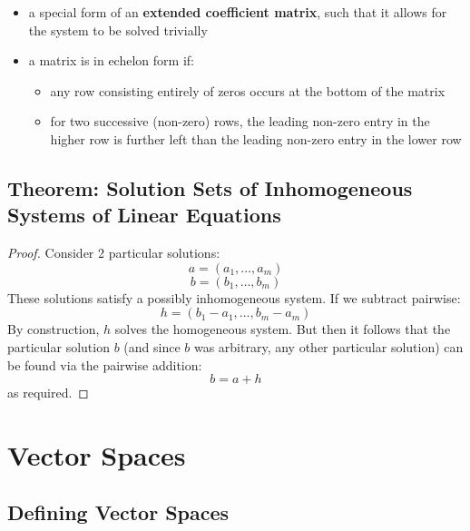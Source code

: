 \documentclass{exam}
\begin{document}
\begin{itemize}
     \begin{itemize}
        \item a special form of an \textbf{extended coefficient matrix}, such that it allows for the system to be solved trivially
        \item a matrix is in echelon form if:
        \begin{itemize}
            \item any row consisting entirely of zeros occurs at the bottom of the matrix
            \item for two successive (non-zero) rows, the leading non-zero entry in the higher row is further left than the leading non-zero entry in the lower row
        \end{itemize}
    \end{itemize}
\end{itemize}

\subsection{Theorem: Solution Sets of Inhomogeneous Systems of Linear Equations}


\begin{proof}

Consider 2 particular solutions:
\[
a = (a_1, \ldots, a_m) 
\]
\[
b = (b_1, \ldots, b_m) 
\]
These solutions satisfy a possibly inhomogeneous system. If we subtract pairwise:
\[
h = (b_1 - a_1, \ldots, b_m - a_m) 
\]
By construction, $h$ solves the homogeneous system. But then it follows that the particular solution $b$ (and since $b$ was arbitrary, any other particular solution) can be found via the pairwise addition:
\[
b = a + h
\]
as required.

\end{proof}

\section{Vector Spaces}

\subsection{Defining Vector Spaces}
\end{document}
